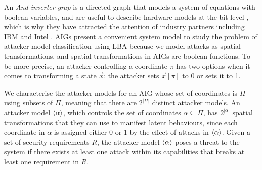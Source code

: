 An \emph{And-inverter grap} is a directed graph that models a system of equations \cite{AIGs,AIGs2} with boolean variables, and are useful to describe hardware models at the bit-level \cite{AIGER}, which is why they have attracted the attention of industry partners including IBM and Intel \cite{HWMCC2014BM}. 
AIGs present a convenient system model to study the problem of attacker model classification using LBA because we model attacks as spatial transformations, and spatial transformations in AIGs are boolean functions. To be more precise, an attacker controlling a coordinate $\pi$ has two options when it comes to transforming a state $\vec{x}$: the attacker sets $\vec{x}[\pi]$ to 0 or sets it to 1. 

We characterise the attacker models for an AIG whose set of coordinates is $\Pi$ using subsets of $\Pi$, meaning that there are $2^{|\Pi|}$ distinct attacker models. An attacker model ${{\left<\alpha\right>}}$, which controls the set of coordinates $\alpha\subseteq \Pi$, has $2^{|\alpha|}$ spatial transformations that they can use to manifest latent behaviours, since each coordinate in $\alpha$ is assigned either 0 or 1 by the effect of attacks in ${{\left<\alpha\right>}}$. Given a set of security requirements $R$, the attacker model ${{\left<\alpha\right>}}$ poses a threat to the system if there exists at least one attack within its capabilities that breaks at least one requirement in $R$. 

